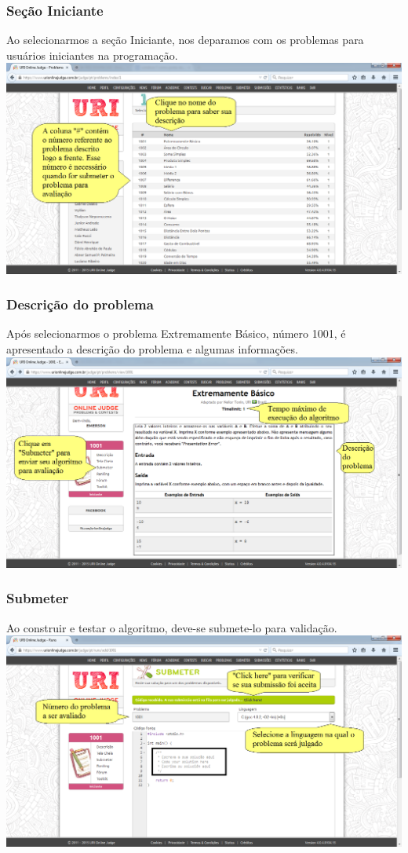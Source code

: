 \begin{frame}
 \frametitle{Seção Iniciante}
 Ao selecionarmos a seção Iniciante, nos deparamos com os
 problemas para usuários iniciantes na programação.
 \includegraphics[scale=.28]{uri/Imagens/06Iniciante.png}
\end{frame}

\begin{frame}
 \frametitle{Descrição do problema}
 Após selecionarmos o problema Extremamente Básico, número 1001,
 é apresentado a descrição do problema e algumas informações.
 \includegraphics[scale=.28]{uri/Imagens/07DescricaoProblema.png}
\end{frame}

\begin{frame}
 \frametitle{Submeter}
 Ao construir e testar o algoritmo, deve-se submete-lo para validação.
 \includegraphics[scale=.28]{uri/Imagens/08Submeter.png}
\end{frame}

